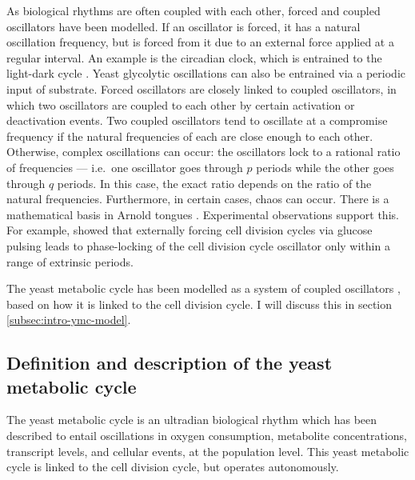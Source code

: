 As biological rhythms are often coupled with each other, forced and coupled oscillators have been modelled.
If an oscillator is forced, it has a natural oscillation frequency, but is forced from it due to an external force applied at a regular interval.
An example is the circadian clock, which is entrained to the light-dark cycle \parencite{goldbeterMultisynchronizationOtherPatterns}.
Yeast glycolytic oscillations can also be entrained via a periodic input of substrate.
Forced oscillators are closely linked to coupled oscillators, in which two oscillators are coupled to each other by certain activation or deactivation events.
Two coupled oscillators tend to oscillate at a compromise frequency if the natural frequencies of each are close enough to each other.
Otherwise, complex oscillations can occur: the oscillators lock to a rational ratio of frequencies --- i.e.\ one oscillator goes through $p$ periods while the other goes through $q$ periods.
In this case, the exact ratio depends on the ratio of the natural frequencies.
Furthermore, in certain cases, chaos can occur.
There is a mathematical basis in Arnold tongues \parencite{heltbergTaleTwoRhythms2021}.
Experimental observations support this.
For example, \textcite{charvinForcedPeriodicExpression2009} showed that externally forcing cell division cycles via glucose pulsing leads to phase-locking of the cell division cycle oscillator only within a range of extrinsic periods.

The yeast metabolic cycle has been modelled as a system of coupled oscillators \parencite{papagiannakisAutonomousMetabolicOscillations2017,ozsezenInferenceHighLevelInteraction2019}, based on how it is linked to the cell division cycle.
I will discuss this in section \ref{subsec:intro-ymc-model}.

\subsection{Definition and description of the yeast metabolic cycle}
\label{subsec:intro-ymc-definition}

The yeast metabolic cycle is an ultradian biological rhythm which has been described to entail oscillations in oxygen consumption, metabolite concentrations, transcript levels, and cellular events, at the population level.
This yeast metabolic cycle is linked to the cell division cycle, but operates autonomously.

